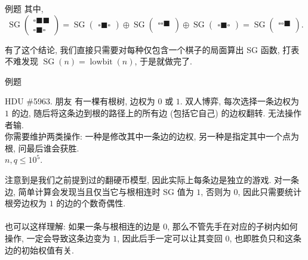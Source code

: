 \documentclass{beamer}
\newcommand{\nl}{\\\hspace*{\fill}\\}
\begin{document}
\begin{frame}{例题}
		其中,
		$$
		\operatorname{SG}\left(\begin{aligned}
			\square\blacksquare\blacksquare\\
			\square\blacksquare\square
		\end{aligned}\right)=
		\operatorname{SG}\left(\begin{aligned}
			\square\blacksquare\square
		\end{aligned}\right)\oplus
		\operatorname{SG}\left(\begin{aligned}
			\square\square\blacksquare\\
		\end{aligned}\right)\oplus
		\operatorname{SG}\left(\begin{aligned}
			\square\blacksquare\square
		\end{aligned}\right)=
		\operatorname{SG}\left(\begin{aligned}
			\square\square\blacksquare\\
		\end{aligned}\right).
		$$

		有了这个结论, 我们直接只需要对每种仅包含一个棋子的局面算出 SG 函数, 打表不难发现 $\operatorname{SG}(n)=\operatorname{lowbit}(n)$, 于是就做完了.
	\end{frame}

	\begin{frame}{例题}
		\begin{block}{HDU \#5963. 朋友}
			有一棵有根树, 边权为 $0$ 或 $1$. 双人博弈, 每次选择一条边权为 $1$ 的边, 随后将这条边到根的路径上的所有边 (包括它自己) 的边权翻转. 无法操作者输.\\
			你需要维护两类操作: 一种是修改其中一条边的边权, 另一种是指定其中一个点为根, 问最后谁会获胜.\\
			$n,q\leq 10^5$.
		\end{block}
		\pause
		注意到是我们之前提到过的翻硬币模型, 因此实际上每条边是独立的游戏. 对一条边, 简单计算会发现当且仅当它与根相连时 SG 值为 $1$, 否则为 $0$, 因此只需要统计根旁边权为 $1$ 的边的个数奇偶性.\nl
		\pause
		也可以这样理解: 如果一条与根相连的边是 $0$, 那么不管先手在对应的子树内如何操作, 一定会导致这条边变为 $1$, 因此后手一定可以让其变回 $0$, 也即胜负只和这条边的初始权值有关.
	\end{frame}
\end{document}
